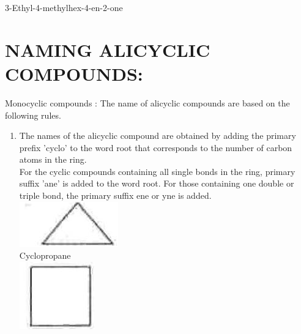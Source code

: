 \documentclass[10pt]{article}
\begin{document}
3-Ethyl-4-methylhex-4-en-2-one

\section*{NAMING ALICYCLIC COMPOUNDS:}
Monocyclic compounds : The name of alicyclic compounds are based on the following rules.

\begin{enumerate}
  \item The names of the alicyclic compound are obtained by adding the primary prefix 'cyclo' to the word root that corresponds to the number of carbon atoms in the ring.\\
For the cyclic compounds containing all single bonds in the ring, primary suffix 'ane' is added to the word root. For those containing one double or triple bond, the primary suffix ene or yne is added.\\
\includegraphics[max width=\textwidth, center]{2025_01_28_8470952b98110cec3aabg-033(1)}\\
Cyclopropane\\
\includegraphics[max width=\textwidth, center]{2025_01_28_8470952b98110cec3aabg-033}\\

\end{enumerate}
\end{document}
